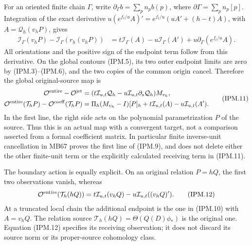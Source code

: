\documentclass[11pt,a4paper]{article}
\theoremstyle{definition}
\begin{document}
For an oriented finite chain \(\Gamma\), write
\(\partial_\Gamma b=\sum_p n_p b(p)\), where
\(\partial\Gamma=\sum_p n_p[p]\). Integration of the exact
derivative \(u(e^{f_t/u}A)'=e^{f_t/u}(uA'+(h-t)A)\), with
\(A=\mathcal Q_h(v_hP)\), gives
\[
 \begin{aligned}
 \mathcal I_\Gamma(v_hP)-\mathcal I_\Gamma(r_h(v_hP))
   &=t\mathcal I_\Gamma(A)-u\mathcal I_\Gamma(A')
          +u\partial_\Gamma(e^{f_t/u}A).
 \end{aligned}
 \tag{IPM.10}
\]
All orientations and the positive sign of the endpoint term follow
from this derivative. On the global contours (IPM.5), its two outer
endpoint limits are zero by (IPM.3)--(IPM.6), and the two copies of
the common origin cancel. Therefore the global original-source map is
\[
 \begin{aligned}
 \mathcal O^{\rm entire}-\mathcal O^{\rm jet}
   &=(t\mathcal I_{u,t}\mathcal Q_h
            -u\mathcal I_{u,t}\partial_s\mathcal Q_h)M_{v_h},\\
 \mathcal O^{\rm entire}(\mathcal T_hP)
       -\mathcal O^{\rm coeff}(\mathcal T_hP)
   &=\Pi_h(M_{\upsilon_h}-I)[P]_h
       +t\mathcal I_{u,t}(A)-u\mathcal I_{u,t}(A').
 \end{aligned}
 \tag{IPM.11}
\]
In the first line, the right side acts on the polynomial parametrization
\(P\) of the source. Thus this is an actual map with a convergent
target, not a comparison asserted from a formal coefficient matrix.
In particular finite inverse-unit cancellation in MB67 proves the first
line of (IPM.9), and does not delete either the other finite-unit term
or the explicitly calculated receiving term in (IPM.11).

The boundary action is equally explicit. On an original relation
\(P=hQ\), the first two observations vanish, whereas
\[
 \mathcal O^{\rm entire}(\mathcal T_h(hQ))
     =t\mathcal I_{u,t}(v_hQ)-u\mathcal I_{u,t}((v_hQ)').
 \tag{IPM.12}
\]
At a truncated local chain the additional endpoint is the one in
(IPM.10) with \(A=v_hQ\). The relation source
\(\mathcal T_h(hQ)=\Theta(Q(D)\phi_*)\) is the original one.
Equation (IPM.12) specifies its receiving observation; it does not
discard its source norm or its proper-source cohomology class.
\end{document}
